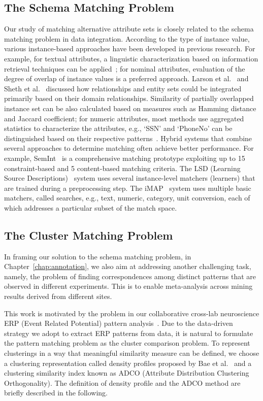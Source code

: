 \subsection{The Schema Matching Problem}
Our study of matching alternative attribute sets is closely related to the schema matching problem in data integration. According to the type of instance value, various instance-based approaches have been developed in previous research. For example, for textual attributes, a linguistic characterization based on information retrieval techniques can be applied~\cite{Rahm01asurvey}; for nominal attributes, evaluation of the degree of overlap of instance values is a preferred approach. Larson et al.~\cite{Larson1989} and Sheth et al.~\cite{Sheth1988} discussed how relationships and entity sets could be integrated primarily based on their domain relationships. Similarity of partially overlapped instance set can be also calculated based on measures such as Hamming distance and Jaccard coefficient; for numeric attributes, most methods use aggregated statistics to characterize the attributes, e.g., `SSN' and `PhoneNo' can be distinguished based on their respective patterns~\cite{Rahm01asurvey}. Hybrid systems that combine several approaches to determine matching often achieve better performance. For example, SemInt~\cite{Li00semint:a} is a comprehensive matching prototype exploiting up to 15 constraint-based and 5 content-based matching criteria. The LSD (Learning Source Descriptions)~\cite{Doan2000} system uses several instance-level matchers (learners) that are trained during a preprocessing step. The iMAP~\cite{Dhamankar04imap} system uses multiple basic matchers, called searches, e.g., text, numeric, category, unit conversion, each of which addresses a particular subset of the match space.


\subsection{The Cluster Matching Problem}
\label{sec:clusterMatching}
In framing our solution to the schema matching problem, in Chapter~\ref{chap:annotation}, we also aim at addressing another challenging task, namely, the problem of finding correspondences among distinct patterns that are observed in different experiments. This is to enable meta-analysis across mining results derived from different sites.

This work is motivated by the problem in our collaborative cross-lab neuroscience ERP (Event Related Potential) pattern analysis~\cite{FrishkoffEtal09, LiuEtal10}. Due to the data-driven strategy we adopt to extract ERP patterns from data, it is natural to formulate the pattern matching problem as the cluster comparison problem. To represent clusterings in a way that meaningful similarity measure can be defined, we choose a clustering representation called density profiles proposed by Bae et al.~\cite{Bae2010} and a clustering similarity index known as ADCO (Attribute Distribution Clustering Orthogonality). The definition of density profile and the ADCO method are briefly described in the following.

